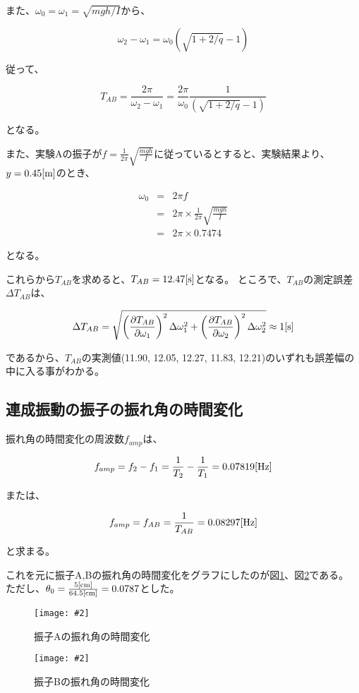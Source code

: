 \documentclass[uplatex,11pt]{jsarticle}
\newcommand{\cir}[3]{ %
    \begin{figure}
        \begin{center}
            \texttt{[image: \#2]}
            \caption{#3}
            \label{fg_#1}
         \end{center}
    \end{figure}
}
\newcommand{\fr}[1]{図\ref{fg_#1}}
\begin{document}
また、$\omega_0 = \omega_1 = \sqrt{mgh/I}$から、

\[
    \omega_2 - \omega_1 = \omega_0 \left( \sqrt{1 + 2/q} - 1 \right)
\]

従って、

\[
    T_{AB} = \frac{2\pi}{\omega_2 - \omega_1} = \frac{2\pi}{\omega_0}\frac{1}{\left(\sqrt{1+2/q} - 1\right)}
\]

となる。

また、実験Aの振子が$f = \frac{1}{2\pi}\sqrt{\frac{mgh}{I}}$に従っているとすると、実験結果より、$y=0.45[{\rm m}]$のとき、

\begin{eqnarray*}
    \omega_0 & = & 2\pi f \\
             & = & 2\pi \times \frac{1}{2\pi}\sqrt{\frac{mgh}{I}} \\
             & = & 2\pi \times 0.7474
\end{eqnarray*}

となる。

これらから$T_{AB}$を求めると、$T_{AB} = 12.47[{\rm s}]$となる。
ところで、$T_{AB}$の測定誤差$\Delta T_{AB}$は、

\[
    \Delta T_{AB} = \sqrt{\left( \frac{\partial T_{AB}}{\partial \omega_1} \right)^2 \Delta \omega_1^2 + \left( \frac{\partial T_{AB}}{\partial \omega_2}  \right)^2 \Delta \omega_2^2} \approx 1[{\rm s}]
\]

であるから、$T_{AB}$の実測値(11.90, 12.05, 12.27, 11.83, 12.21)のいずれも誤差幅の中に入る事がわかる。

\subsection{連成振動の振子の振れ角の時間変化}

振れ角の時間変化の周波数$f_{amp}$は、

$$
    f_{amp} = f_2 - f_1 = \frac{1}{T_2} - \frac{1}{T_1} = 0.07819[{\rm Hz}]
$$

または、

$$
    f_{amp} = f_{AB} = \frac{1}{T_{AB}} = 0.08297[{\rm Hz}]
$$

と求まる。

これを元に振子A,Bの振れ角の時間変化をグラフにしたのが\fr{f_theta_A}、\fr{f_theta_B}である。
ただし、$\theta_0 = \frac{5[{\rm cm}]}{64.5[{\rm cm}]} = 0.0787$とした。

\cir{f_theta_A}{graph/t_to_theta_A.png}{振子Aの振れ角の時間変化}
\cir{f_theta_B}{graph/t_to_theta_B.png}{振子Bの振れ角の時間変化}
\end{document}
